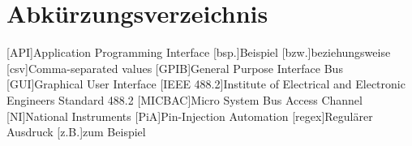 \section*{Abkürzungsverzeichnis}
\begin{acronym}[MICBAC]
[API]{Application Programming Interface}
[bsp.]{Beispiel}
[bzw.]{beziehungsweise}
[csv]{Comma-separated values}
[GPIB]{General Purpose Interface Bus}
[GUI]{Graphical User Interface}
[IEEE 488.2]{Institute of Electrical and Electronic Engineers Standard 488.2}
[MICBAC]{Micro System Bus Access Channel}
[NI]{National Instruments}
[PiA]{Pin-Injection Automation}
[regex]{Regulärer Ausdruck}
[z.B.]{zum Beispiel}
\end{acronym}
